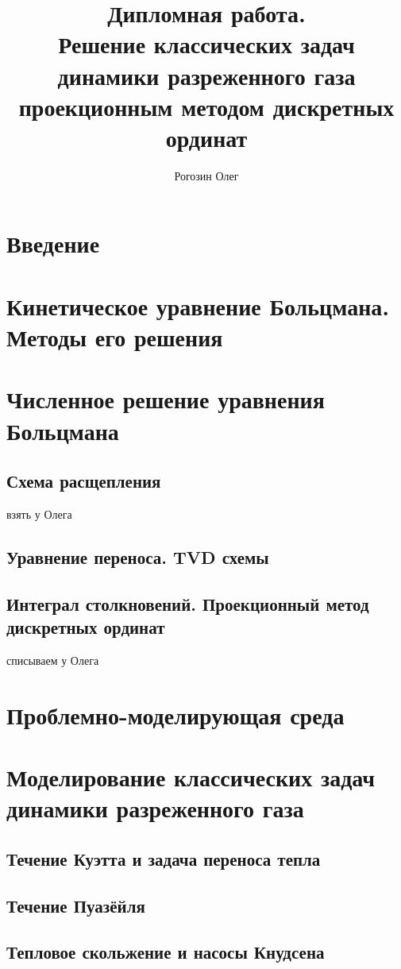 \documentclass[a4paper,12pt]{article}
\title{Дипломная работа. \\ Решение классических задач динамики разреженного газа проекционным методом дискретных ординат}
\author{Рогозин Олег}
\numberwithin{equation}{section}
\begin{document}
\maketitle
\tableofcontents

\section{Введение}


\section{Кинетическое уравнение Больцмана. Методы его решения}


\section{Численное решение уравнения Больцмана}

\subsection{Схема расщепления}
взять у Олега

\subsection{Уравнение переноса. TVD схемы}


\subsection{Интеграл столкновений. Проекционный метод дискретных ординат}
списываем у Олега

\section{Проблемно-моделирующая среда}


\section{Моделирование классических задач динамики разреженного газа}


\subsection{Течение Куэтта и задача переноса тепла}


\subsection{Течение Пуазёйля}


\subsection{Тепловое скольжение и насосы Кнудсена}

\end{document}
